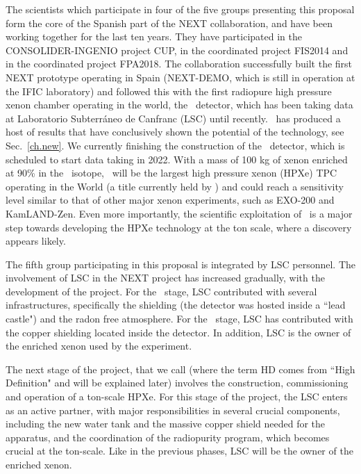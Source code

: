 
 The scientists which participate in four of the five groups presenting this proposal form the core of the Spanish part of the NEXT collaboration, and have been working together for the last ten years. They have participated in the CONSOLIDER-INGENIO project CUP, in the coordinated project FIS2014 and in the coordinated project FPA2018. The collaboration successfully built the first NEXT prototype operating in Spain (NEXT-DEMO, which is still in operation at the IFIC laboratory) and followed this with the first radiopure high pressure xenon chamber operating in the world, the \NEW\ detector, which has been taking data at Laboratorio Subterr\'aneo de Canfranc (LSC) until recently. \NEW\ has produced a host of results that have conclusively shown the potential of the technology, see Sec.~\ref{ch.new}. We currently finishing the construction of the \Next\ detector, which is scheduled to start data taking in 2022. With a mass of 100 kg of xenon enriched at 90\% in the \XE\ isotope, \Next\ will be the largest high pressure xenon (HPXe) TPC operating in the World (a title currently held by \NEW) and could reach a sensitivity level similar to that of other major xenon experiments, such as EXO-200 and KamLAND-Zen. Even more importantly, the scientific exploitation of \Next\ is a major step towards developing the HPXe technology at the ton scale, where a discovery appears likely. 
 
 The fifth group participating in this proposal is integrated by LSC personnel. The involvement of LSC in the NEXT project has increased gradually, with the development of the project. For the \NEW\ stage, LSC contributed with several infrastructures, specifically the shielding (the detector was hosted inside a ``lead castle") and the radon free atmosphere. For the \Next\ stage, LSC has contributed with the copper shielding located inside the detector. In addition, LSC is the owner of the enriched xenon used by the experiment. 
 
 The next stage of the project, that we call \NHD (where the term HD comes from ``High Definition" and will be explained later) involves the construction, commissioning and operation of a ton-scale HPXe. For this stage of the project, the LSC enters as an active partner, with major responsibilities in several crucial components, including the new water tank and the massive copper shield needed for the apparatus, and the coordination of the radiopurity program, which becomes crucial at the ton-scale. Like in the previous phases, LSC will be the owner of the enriched xenon. 
 
